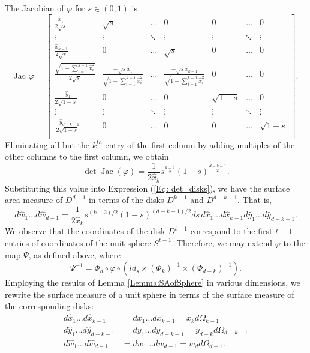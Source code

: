 \documentclass[twoside,11pt]{article}
\DeclareMathOperator{\Jac}{Jac}
\begin{document}
			The Jacobian of $\varphi$ for $s\in(0,1)$ is 		
				$$
				\text{Jac }\varphi = 
				\left[
				\begin{array}{c|ccc|ccc}
					\frac{\hat{x}_1}{2\sqrt{s}}	& \sqrt{s} & \dots & 0 & 0& \dots & 0 \\[.3cm]
					\vdots & \vdots & \ddots & \vdots & \vdots & \ddots & \vdots \\[.4cm]
					\frac{\hat{x}_{k-1}}{2\sqrt{s}} & 0 & \dots & \sqrt{s} &  0 & \dots & 0\\ [.3cm] \hline
					\frac{\sqrt{1-\sum_{i=1}^{k-1}\hat{x}_i^2}}{2\sqrt{s}} &  \frac{-\sqrt{s} \hat{x}_1}{\sqrt{1-\sum_{i=1}^{k-1}\hat{x}_i^2}} & \dots & \frac{-\sqrt{s} 
					\hat{x}_{k-1}}
					{\sqrt{1-\sum_{i=1}^{k-1}\hat{x}_i^2}} & 0 & \dots & 0 \\[.35cm] \hline
					\frac{-\hat{y}_1}{2\sqrt{1-s}} & 0 & \dots & 0 & \sqrt{1-s} & \dots & 0 \\[.3cm]
					\vdots & \vdots & \ddots & \vdots & \vdots & \ddots & \vdots \\ [.4cm]
					\frac{-\hat{y}_{d-k-1}}{2\sqrt{1-s}} & 0 & \dots & 0 & 0 & \dots & \sqrt{1-s}\\ [.3cm] 
				\end{array}
				\right].
				$$
			Eliminating all but the $k^{th}$ entry of the first column by
			adding multiples of the other columns to the first column, we obtain
				\[\det \Jac ( \varphi ) =	\frac{1}{2\hat{x}_k} s^{\frac{k-2}{2}} (1-s)^{\frac{d-k-1}{2}}.\]		
			Substituting this value into Expression (\ref{Eq: det_disks}), we have the surface area measure of $D^{d-1}$  in terms of the disks $D^{k-1}$ and $D^{d-k-1}$. 
			That is,	
				\begin{equation} \label{Eqn: SA of D}
				d\hat{w}_1 \dots d\hat{w}_{d-1} = \frac{1}{2\hat{x}_{k}} s^{(k-2)/2} (1-s)^{(d-k-1)/2} ds \, d\hat{x}_1 \dots d\hat{x}_{k-1} d\hat{y}_1 \dots 
				d\hat{y}_{d-k-1}. 
				\end{equation}
			We observe that the coordinates of the disk $D^{t-1}$ correspond to the first $t-1$ entries of coordinates  of the unit sphere $S^{t-1}$.  Therefore, we may extend $\varphi$ to the map $\Psi$, as defined above, where 
			$$\Psi^{-1}=\Phi_d\circ\varphi\circ (id_s\times(\Phi_k)^{-1}\times(\Phi_{d-k})^{-1}).
			$$			
			Employing 
			the 
			results of Lemma \ref{Lemma:SAofSphere} in various dimensions, we rewrite the surface measure of a unit sphere in terms of the surface measure of the corresponding disks:
				\begin{align*}
						 d\hat{x}_1 \dots d\hat{x}_{k-1} &= dx_1 \dots dx_{k-1} = x_k d\Omega_{k-1} \\
						d\hat{y}_1 \dots d\hat{y}_{d-k-1} &= dy_1 \dots dy_{d-k-1} = y_{d-k} d\Omega_{d-k-1} \\
					 d\hat{w}_1 \dots d\hat{w}_{d-1} &= dw_1 \dots dw_{d-1} = w_d d\Omega_{d-1}.  
				\end{align*}			
\end{document}
